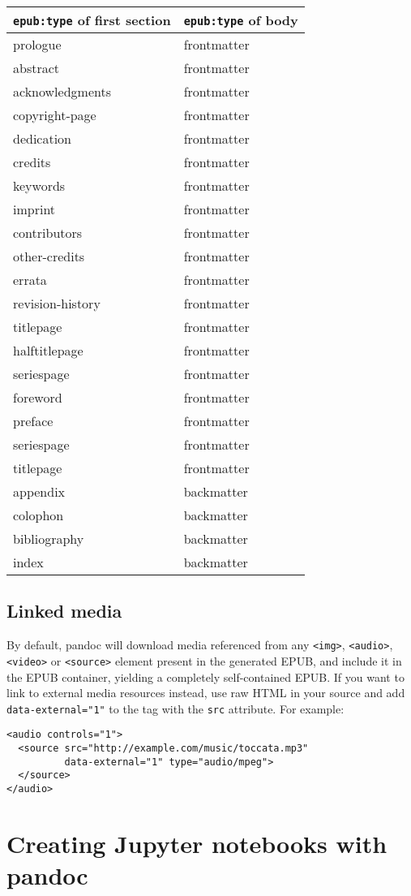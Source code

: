 \documentclass[
  12pt,
  a4paper,
]{article}
\begin{document}
\begin{longtable}[]{@{}ll@{}}
\toprule
\texttt{epub:type} of first section & \texttt{epub:type} of body\tabularnewline
\midrule
\endhead
prologue & frontmatter\tabularnewline
abstract & frontmatter\tabularnewline
acknowledgments & frontmatter\tabularnewline
copyright-page & frontmatter\tabularnewline
dedication & frontmatter\tabularnewline
credits & frontmatter\tabularnewline
keywords & frontmatter\tabularnewline
imprint & frontmatter\tabularnewline
contributors & frontmatter\tabularnewline
other-credits & frontmatter\tabularnewline
errata & frontmatter\tabularnewline
revision-history & frontmatter\tabularnewline
titlepage & frontmatter\tabularnewline
halftitlepage & frontmatter\tabularnewline
seriespage & frontmatter\tabularnewline
foreword & frontmatter\tabularnewline
preface & frontmatter\tabularnewline
seriespage & frontmatter\tabularnewline
titlepage & frontmatter\tabularnewline
appendix & backmatter\tabularnewline
colophon & backmatter\tabularnewline
bibliography & backmatter\tabularnewline
index & backmatter\tabularnewline
\bottomrule
\end{longtable}

\hypertarget{linked-media}{%
\subsection{Linked media}\label{linked-media}}

By default, pandoc will download media referenced from any \texttt{\textless{}img\textgreater{}},
\texttt{\textless{}audio\textgreater{}}, \texttt{\textless{}video\textgreater{}} or
\texttt{\textless{}source\textgreater{}} element present in the generated EPUB, and include it in
the EPUB container, yielding a completely self-contained EPUB. If you want to link to external
media resources instead, use raw HTML in your source and add \texttt{data-external="1"} to the tag
with the \texttt{src} attribute. For example:

\begin{verbatim}
<audio controls="1">
  <source src="http://example.com/music/toccata.mp3"
          data-external="1" type="audio/mpeg">
  </source>
</audio>
\end{verbatim}

\hypertarget{creating-jupyter-notebooks-with-pandoc}{%
\section{Creating Jupyter notebooks with pandoc}\label{creating-jupyter-notebooks-with-pandoc}}
\end{document}
